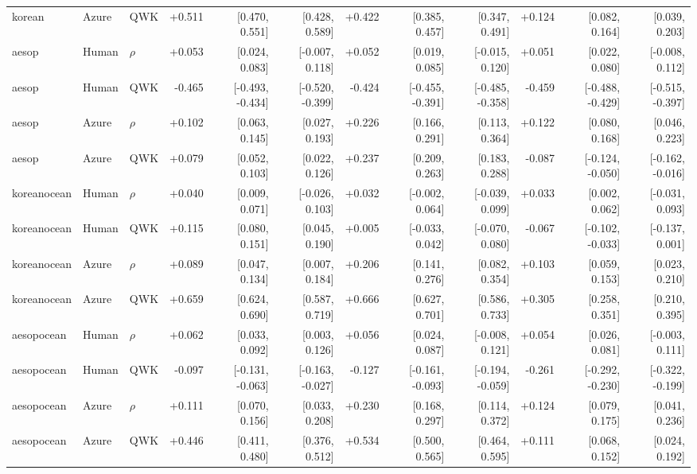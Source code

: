 \begin{landscape}
\begin{longtable}{@{}lllrrrrrrrrr@{}}
korean & Azure & QWK & +0.511 & [0.470, 0.551] & [0.428, 0.589] & +0.422 & [0.385, 0.457] & [0.347, 0.491] & +0.124 & [0.082, 0.164] & [0.039, 0.203]\\
\addlinespace[2pt]
aesop & Human & $\rho$ & +0.053 & [0.024, 0.083] & [-0.007, 0.118] & +0.052 & [0.019, 0.085] & [-0.015, 0.120] & +0.051 & [0.022, 0.080] & [-0.008, 0.112]\\
aesop & Human & QWK & -0.465 & [-0.493, -0.434] & [-0.520, -0.399] & -0.424 & [-0.455, -0.391] & [-0.485, -0.358] & -0.459 & [-0.488, -0.429] & [-0.515, -0.397]\\
aesop & Azure & $\rho$ & +0.102 & [0.063, 0.145] & [0.027, 0.193] & +0.226 & [0.166, 0.291] & [0.113, 0.364] & +0.122 & [0.080, 0.168] & [0.046, 0.223]\\
aesop & Azure & QWK & +0.079 & [0.052, 0.103] & [0.022, 0.126] & +0.237 & [0.209, 0.263] & [0.183, 0.288] & -0.087 & [-0.124, -0.050] & [-0.162, -0.016]\\
\addlinespace[2pt]
koreanocean & Human & $\rho$ & +0.040 & [0.009, 0.071] & [-0.026, 0.103] & +0.032 & [-0.002, 0.064] & [-0.039, 0.099] & +0.033 & [0.002, 0.062] & [-0.031, 0.093]\\
koreanocean & Human & QWK & +0.115 & [0.080, 0.151] & [0.045, 0.190] & +0.005 & [-0.033, 0.042] & [-0.070, 0.080] & -0.067 & [-0.102, -0.033] & [-0.137, 0.001]\\
koreanocean & Azure & $\rho$ & +0.089 & [0.047, 0.134] & [0.007, 0.184] & +0.206 & [0.141, 0.276] & [0.082, 0.354] & +0.103 & [0.059, 0.153] & [0.023, 0.210]\\
koreanocean & Azure & QWK & +0.659 & [0.624, 0.690] & [0.587, 0.719] & +0.666 & [0.627, 0.701] & [0.586, 0.733] & +0.305 & [0.258, 0.351] & [0.210, 0.395]\\
\addlinespace[2pt]
aesopocean & Human & $\rho$ & +0.062 & [0.033, 0.092] & [0.003, 0.126] & +0.056 & [0.024, 0.087] & [-0.008, 0.121] & +0.054 & [0.026, 0.081] & [-0.003, 0.111]\\
aesopocean & Human & QWK & -0.097 & [-0.131, -0.063] & [-0.163, -0.027] & -0.127 & [-0.161, -0.093] & [-0.194, -0.059] & -0.261 & [-0.292, -0.230] & [-0.322, -0.199]\\
aesopocean & Azure & $\rho$ & +0.111 & [0.070, 0.156] & [0.033, 0.208] & +0.230 & [0.168, 0.297] & [0.114, 0.372] & +0.124 & [0.079, 0.175] & [0.041, 0.236]\\
aesopocean & Azure & QWK & +0.446 & [0.411, 0.480] & [0.376, 0.512] & +0.534 & [0.500, 0.565] & [0.464, 0.595] & +0.111 & [0.068, 0.152] & [0.024, 0.192]\\

\end{longtable}
\end{landscape}
